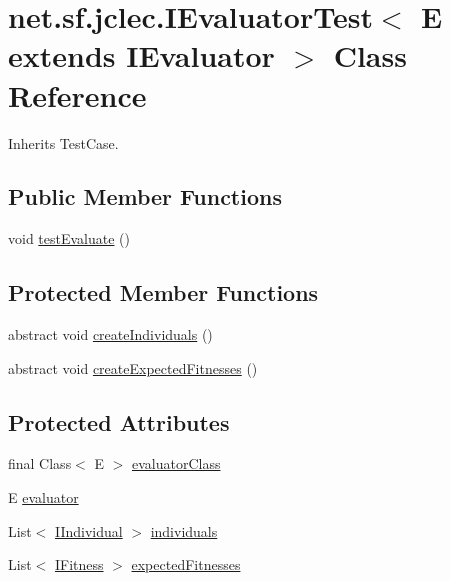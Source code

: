 \hypertarget{classnet_1_1sf_1_1jclec_1_1_i_evaluator_test_3_01_e_01extends_01_i_evaluator_01_4}{\section{net.\-sf.\-jclec.\-I\-Evaluator\-Test$<$ E extends I\-Evaluator $>$ Class Reference}
\label{classnet_1_1sf_1_1jclec_1_1_i_evaluator_test_3_01_e_01extends_01_i_evaluator_01_4}
}


Inherits Test\-Case.

\subsection*{Public Member Functions}
\begin{DoxyCompactItemize}
\item 
void \hyperlink{classnet_1_1sf_1_1jclec_1_1_i_evaluator_test_3_01_e_01extends_01_i_evaluator_01_4_ad90da0474ca544c3350cbe9e298d0330}{test\-Evaluate} ()
\end{DoxyCompactItemize}
\subsection*{Protected Member Functions}
\begin{DoxyCompactItemize}
\item 
abstract void \hyperlink{classnet_1_1sf_1_1jclec_1_1_i_evaluator_test_3_01_e_01extends_01_i_evaluator_01_4_a63d42ba80ece0cfd0557793b3ab128f7}{create\-Individuals} ()
\item 
abstract void \hyperlink{classnet_1_1sf_1_1jclec_1_1_i_evaluator_test_3_01_e_01extends_01_i_evaluator_01_4_a17ea111274b0bc6a8a5fbcdbf470addb}{create\-Expected\-Fitnesses} ()
\end{DoxyCompactItemize}
\subsection*{Protected Attributes}
\begin{DoxyCompactItemize}
\item 
final Class$<$ E $>$ \hyperlink{classnet_1_1sf_1_1jclec_1_1_i_evaluator_test_3_01_e_01extends_01_i_evaluator_01_4_aed83be544054b31a5cde71561a99f7aa}{evaluator\-Class}
\item 
E \hyperlink{classnet_1_1sf_1_1jclec_1_1_i_evaluator_test_3_01_e_01extends_01_i_evaluator_01_4_a12b31bfa3b1e8e8e8a40f477af9c79bf}{evaluator}
\item 
List$<$ \hyperlink{interfacenet_1_1sf_1_1jclec_1_1_i_individual}{I\-Individual} $>$ \hyperlink{classnet_1_1sf_1_1jclec_1_1_i_evaluator_test_3_01_e_01extends_01_i_evaluator_01_4_a3ee8e5c85b3ebbfc5218bc32f986161e}{individuals}
\item 
List$<$ \hyperlink{interfacenet_1_1sf_1_1jclec_1_1_i_fitness}{I\-Fitness} $>$ \hyperlink{classnet_1_1sf_1_1jclec_1_1_i_evaluator_test_3_01_e_01extends_01_i_evaluator_01_4_a5115d885506add643e01d7be37e44fd4}{expected\-Fitnesses}
\end{DoxyCompactItemize}


